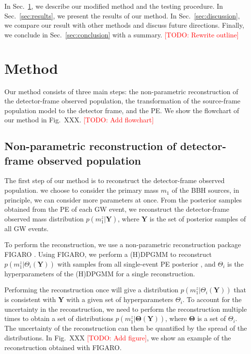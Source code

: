 \documentclass[aps,prd,twocolumn,superscriptaddress,preprintnumbers,nofootinbib,hidelinks]{revtex4-2}
\newcommand{\todo}[1]{\textcolor{red}{[TODO: #1]}}
\begin{document}
In Sec.~\ref{sec:method}, we describe our modified method and the testing procedure.
In Sec.~\ref{sec:results}, we present the results of our method.
In Sec.~\ref{sec:discussion}, we compare our result with other methods and discuss future directions.
Finally, we conclude in Sec.~\ref{sec:conclusion} with a summary.
\todo{Rewrite outline}

\section{Method}
\label{sec:method}

Our method consists of three main steps: the non-parametric reconstruction of the detector-frame observed population, the transformation of the source-frame population model to the detector frame, and the \ac{PE}.
We show the flowchart of our method in Fig.~XXX. \todo{Add flowchart}

\subsection{Non-parametric reconstruction of detector-frame observed population}
\label{sec:reconstruction}

The first step of our method is to reconstruct the detector-frame observed population.
we choose to consider the primary mass $m_1$ of the \ac{BBH} sources, in principle, we can consider more parameters at once.
From the posterior samples obtained from the \ac{PE} of each \ac{GW} event, we reconstruct the detector-frame observed mass distribution $p(m^z_1|\mathbf{Y})$, where $\mathbf{Y}$ is the set of posterior samples of all \ac{GW} events.

To perform the reconstruction, we use a non-parametric reconstruction package \textsc{FIGARO} \citep{Rinaldi:2022kyg}.
Using \textsc{FIGARO}, we perform a \ac{(H)DPGMM} to reconstruct $p(m^z_1|\Theta_i(\mathbf{Y}))$ with samples from all single-event \ac{PE} posterior \citep{Rinaldi:2021bhm}, and $\Theta_i$ is the hyperparameters of the \ac{(H)DPGMM} for a single reconstruction.

Performing the reconstruction once will give a distribution $p(m^z_1|\Theta_i(\mathbf{Y}))$ that is consistent with $\mathbf{Y}$ with a given set of hyperparameters $\Theta_i$.
To account for the uncertainty in the reconstruction, we need to perform the reconstruction multiple times to obtain a set of distributions $p(m^z_1|\mathbf{\Theta}(\mathbf{Y}))$, where $\mathbf{\Theta}$ is a set of $\Theta_i$.
The uncertainty of the reconstruction can then be quantified by the spread of the distributions.
In Fig.~XXX \todo{Add figure}, we show an example of the reconstruction obtained with \textsc{FIGARO}.
\end{document}
